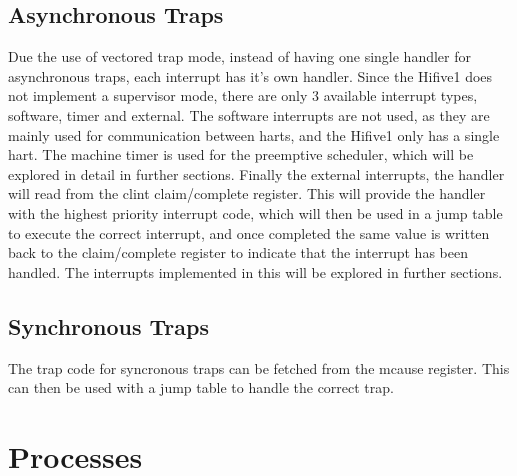 \subsection{Asynchronous Traps}
Due the use of vectored trap mode, instead of having one single handler for asynchronous traps, each interrupt has it's own handler. Since the Hifive1 does not implement a supervisor mode, there are only 3 available interrupt types, software, timer and external. The software interrupts are not used, as they are mainly used for communication between harts, and the Hifive1 only has a single hart. The machine timer is used for the preemptive scheduler, which will be explored in detail in further sections. Finally the external interrupts, the handler will read from the \ac{clint} claim/complete register. This will provide the handler with the highest priority interrupt code, which will then be used in a jump table to execute the correct interrupt, and once completed the same value is written back to the claim/complete register to indicate that the interrupt has been handled. The interrupts implemented in this will be explored in further sections.
\subsection{Synchronous Traps}
The trap code for syncronous traps can be fetched from the mcause register. This can then be used with a jump table to handle the correct trap.
\section{Processes}

